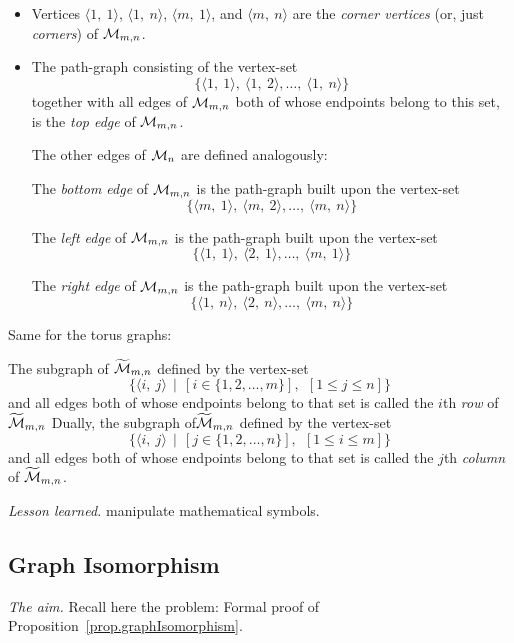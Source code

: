 \begin{itemize}
     \item
Vertices $\langle 1, \ 1 \rangle$, $\langle 1, \ n \rangle$, $\langle m,
\ 1 \rangle$, and $\langle m, \ n \rangle$ are the {\it corner vertices}
(or, just {\it corners}) of $\mbox{$\cal M$}_{m,n}$.
     \item
The path-graph consisting of the vertex-set
\[ \{ \langle 1, \ 1 \rangle, \ \langle 1, \ 2 \rangle, \ldots, \
\langle 1, \ n \rangle \}
\]
together with all edges of $\mbox{$\cal M$}_{m,n}$ both of whose endpoints belong
to this set, is the {\it top edge} of $\mbox{$\cal M$}_{m,n}$.

The other edges of $\mbox{$\cal M$}_n$ are defined analogously:

\medskip

The {\it bottom edge} of $\mbox{$\cal M$}_{m,n}$ is the path-graph built upon the
vertex-set
\[ \{ \langle m, \ 1 \rangle, \ \langle m, \ 2 \rangle, \ldots, \
\langle m, \ n \rangle \}
\]

The {\it left edge} of $\mbox{$\cal M$}_{m,n}$ is the path-graph built upon the
vertex-set
\[ \{ \langle 1, \ 1 \rangle, \ \langle 2, \ 1 \rangle, \ldots, \
\langle m, \ 1 \rangle \}
\]

The {\it right edge} of $\mbox{$\cal M$}_{m,n}$ is the path-graph built upon the
vertex-set
\[ \{ \langle 1, \ n \rangle, \ \langle 2, \ n \rangle, \ldots, \
\langle m, \ n \rangle \}
\]
\end{itemize}
\medskip

Same for the torus graphs:

The subgraph of $\widetilde{\mbox{$\cal M$}}_{m,n}$ defined by the vertex-set
\[ \{ \langle i, \ j \rangle  \ \ | \ \ \left[i \in \{1, 2, \ldots,
  m\}\right], \ \ \left[1 \leq j \leq n\right]\}
\]
and all edges both of whose endpoints belong to that set is called the
$i$th {\it row} of $\widetilde{\mbox{$\cal M$}}_{m,n}$
Dually, the subgraph of$\widetilde{\mbox{$\cal M$}}_{m,n}$ defined by the vertex-set
\[ \{ \langle i, \ j \rangle  \ \ | \ \ \left[j \in \{1, 2, \ldots,
  n\}\right], \ \ \left[1 \leq i \leq m\right] \}
\]
and all edges both of whose endpoints belong to that set is called the
$j$th {\it column} of $\widetilde{\mbox{$\cal M$}}_{m,n}$.
\medskip

\noindent \textit{Lesson learned.}
manipulate mathematical symbols. 


\subsection{Graph Isomorphism}
\label{Exercice:isomorphism}

\noindent \textit{The aim.}
Recall here the problem:
Formal proof of Proposition~\ref{prop.graphIsomorphism}. 
\medskip

